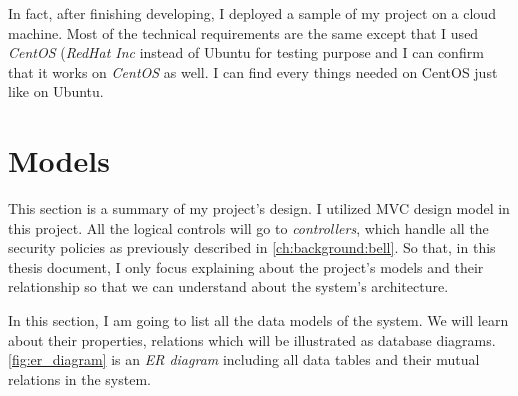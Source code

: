 In fact, after finishing developing, I deployed a sample of my project on a cloud machine.
Most of the technical requirements are the same except that I used \emph{CentOS} (\emph{RedHat Inc} instead of Ubuntu for testing purpose and I can confirm that it works on \emph{CentOS} as well.
I can find every things needed on CentOS just like on Ubuntu.


\section{Models}
\label{ch:implementation:models}

This section is a summary of my project's design.
I utilized MVC design model in this project.
All the logical controls will go to \emph{controllers}, which handle all the security policies as previously described in \autoref{ch:background:bell}.
So that, in this thesis document, I only focus explaining about the project's models and their relationship so that we can understand about the system's architecture.

In this section, I am going to list all the data models of the system.
We will learn about their properties, relations which will be illustrated as database diagrams.
\autoref{fig:er_diagram} is an \emph{ER diagram} including all data tables and their mutual relations in the system.

